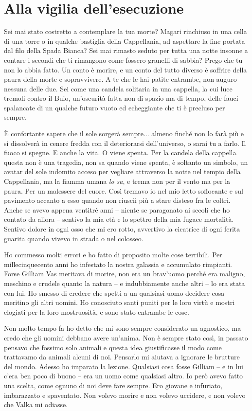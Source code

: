 \chapter{Alla vigilia dell'esecuzione}

Sei mai stato costretto a contemplare la tua morte? Magari rinchiuso in
una cella di una torre o in qualche bastiglia della Cappellania, ad
aspettare la fine portata dal filo della Spada Bianca? Sei mai rimasto
seduto per tutta una notte insonne a contare i secondi che ti rimangono
come fossero granelli di sabbia? Prego che tu non lo abbia fatto. Un
conto è morire, e un conto del tutto diverso è soffrire della paura
della morte e sopravvivere. A te che le hai patite entrambe, non auguro
nessuna delle due. Sei come una candela solitaria in una cappella, la
cui luce tremoli contro il Buio, un'oscurità fatta non di spazio ma di
tempo, delle fauci spalancate di un qualche futuro vuoto ed echeggiante
che ti è precluso per sempre.

È confortante sapere che il sole sorgerà sempre... almeno finché non lo
farà più e si dissolverà in cenere fredda con il deteriorarsi
dell'universo, o sarai tu a farlo. Il fuoco si spegne. E anche la vita.
O viene spenta. Per la candela della cappella questa non è una tragedia,
non sa quando viene spenta, è soltanto un simbolo, un avatar del sole
indomito acceso per vegliare attraverso la notte nel tempio della
Cappellania, ma la fiamma umana \emph{lo sa}, e trema non per il vento
ma per la paura. Per un malessere del cuore. Così tremavo io nel mio
letto soffocante e sul pavimento accanto a esso quando non riuscii più a
stare disteso fra le coltri. Anche se avevo appena ventitré anni --
niente se paragonato ai secoli che ho contato da allora -- sentivo la
mia età e lo spettro della mia fugace mortalità. Sentivo dolore in ogni
osso che mi ero rotto, avvertivo la cicatrice di ogni ferita guarita
quando vivevo in strada o nel colosseo.

Ho commesso molti errori e ho fatto di proposito molte cose terribili.
Per millecinquecento anni ho infestato la nostra galassia e accumulato
rimpianti. Forse Gilliam Vas meritava di morire, non era un brav'uomo
perché era maligno, meschino e crudele quanto la natura -- e
indubbiamente anche altri -- lo era stata con lui. Ho smesso di credere
che spetti a un qualsiasi uomo decidere cosa meritino gli altri uomini.
Ho conosciuto santi puniti per le loro virtù e mostri elogiati per la
loro mostruosità, e sono stato entrambe le cose.

Non molto tempo fa ho detto che mi sono sempre considerato un agnostico,
ma credo che gli uomini debbano avere un'anima. Non è sempre stato così,
in passato pensavo che fossimo solo animali e questa idea giustificasse
il modo come trattavamo da animali alcuni di noi. Pensarlo mi aiutava a
ignorare le brutture del mondo. Adesso ho imparato la lezione. Qualsiasi
cosa fosse Gilliam -- e in lui c'era ben poco di buono -- era un uomo
come qualsiasi altro. Io però avevo fatto una scelta, come ognuno di noi
deve fare sempre. Ero giovane e infuriato, imbarazzato e spaventato. Non
volevo morire e non volevo uccidere, e non volevo che Valka mi odiasse.

